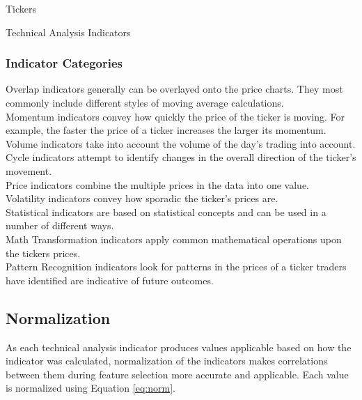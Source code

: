 \documentclass{article}\raggedbottom
\begin{document}
\begin{table}[h]
	\centering
	\caption{Tickers}
	\label{tab:tick}
\end{table}

\begin{table}[h]
	\caption{Technical Analysis Indicators}
	\label{tab:inds}
\end{table}

\subsubsection{Indicator Categories}
  Overlap indicators generally can be overlayed onto the price charts. They most commonly include different styles of moving average calculations.
\\Momentum indicators convey how quickly the price of the ticker is moving. For example, the faster the price of a ticker increases the larger its momentum.
\\Volume indicators take into account the volume of the day's trading into account. 
\\Cycle indicators attempt to identify changes in the overall direction of the ticker's movement.
\\Price indicators combine the multiple prices in the data into one value.
\\Volatility indicators convey how sporadic the ticker's prices are.
\\Statistical indicators are based on statistical concepts and can be used in a number of different ways.
\\Math Transformation indicators apply common mathematical operations upon the tickers prices.
\\Pattern Recognition indicators look for patterns in the prices of a ticker traders have identified are indicative of future outcomes.

\subsection{Normalization}
As each technical analysis indicator produces values applicable based on how the indicator was calculated, normalization of the indicators makes correlations between them during feature selection more accurate and applicable. Each value is normalized using Equation \eqref{eq:norm}.
\end{document}
